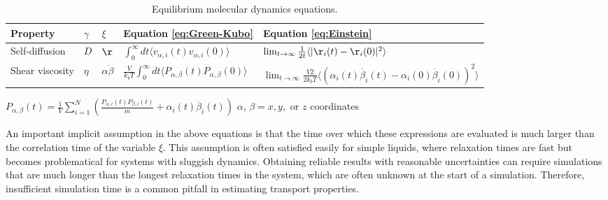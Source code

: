\documentclass[9pt]{livecoms}
\begin{document}
\begin{table}[bt]
	\caption{\label{tab:EMD_equations}Equilibrium molecular dynamics equations.}
	
	\begin{tabular}{l l l l l} 
		\toprule
		Property & $\gamma$          & $\xi$                        & Equation \ref{eq:Green-Kubo}    & Equation \ref{eq:Einstein}     \\
		\midrule
		Self-diffusion     & $D$ & $\r$          & $\int_{0}^{\infty}dt\langle v_{\alpha,i}(t) v_{\alpha,i}(0)\rangle$    & $ \lim_{t\to\infty} \frac{1}{2t}\langle |\r_i(t)-\r_i(0)|^2 \rangle$   \\
		Shear viscosity     & $\eta$       & $\alpha \dot{\beta}$           & $\frac{V}{k_bT} \int_{0}^{\infty}dt\langle P_{\alpha,\beta}(t) P_{\alpha,\beta}(0)\rangle$    & $ \lim_{t\to\infty} \frac{V2}{2k_bT}\langle (\alpha_i(t)\dot{\beta_i}(t)-\alpha_i(0)\dot{\beta_i}(0))^2 \rangle$  \\
		\bottomrule
	\end{tabular}
	\newline
	$P_{\alpha,\beta}(t) = \frac{1}{V} \sum_{i=1}^{N} \left( \frac{P_{\alpha,i}(t)P_{\beta,i}(t)}{m} + \alpha_i(t) \ddot{\beta_i}(t) \right)$
	\newline
	$\alpha$, $\beta = x, y, $ or $z$ coordinates
\end{table}


An important implicit assumption in the above equations is that the time over which these expressions are evaluated is much larger than the correlation time of the variable $\xi$. This assumption is often satisfied easily for simple liquids, where relaxation times are fast but becomes problematical for systems with sluggish dynamics. Obtaining reliable results with reasonable uncertainties can require simulations that are much longer than the longest relaxation times in the system, which are often unknown at the start of a simulation. Therefore, insufficient simulation time is a common pitfall in estimating transport properties.
\end{document}
